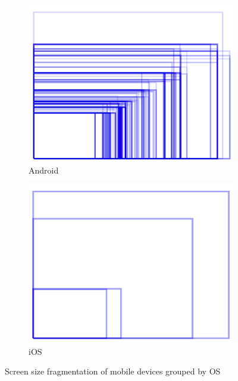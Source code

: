 \begin{figure}[h]
	\centering
	\begin{subfigure}{.49\textwidth}
  		\centering
  		\includegraphics[width=0.98\linewidth]{./images/android-screen.png}
  		\caption{Android}
  		\label{fig:AndroidScreenFragmentation}
	\end{subfigure}
	\begin{subfigure}{.49\textwidth}
  		\centering
  		\includegraphics[width=0.98\linewidth]{./images/ios-screen.png}
  		\caption{iOS}
  		\label{fig:iOSScreenFragmentation}
	\end{subfigure}
	\caption[Screen size fragmentation of mobile devices grouped by \acrfull{OS}, retrieved from \cite{OpenSignal:2014aa}]{Screen size fragmentation of mobile devices grouped by \acrfull{OS}}
	\label{fig:MobileScreenFragmentation}
\end{figure}
\nocite{OpenSignal:2014aa}


